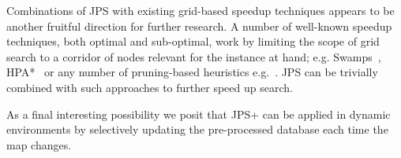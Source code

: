 Combinations of JPS with existing grid-based speedup 
techniques appears to be another fruitful direction for further research. 
A number of well-known speedup techniques, both optimal and sub-optimal,
work by limiting the scope of grid search to a corridor of nodes relevant
for the instance at hand; e.g. Swamps~\cite{pochter10}, HPA{*}~\cite{botea04}
or any number of pruning-based heuristics e.g.~\cite{bjornsson05,goldenberg10}.
JPS can be trivially combined with such approaches to further speed up search.

As a final interesting possibility we posit that JPS+ can be applied in 
dynamic environments by selectively updating the pre-processed database each 
time the map changes.

%

